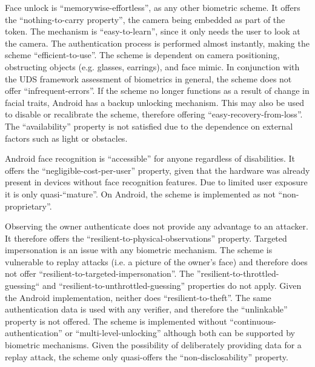 Face unlock is ``memorywise-effortless'', as any other biometric scheme. It offers the ``nothing-to-carry property'', the camera being embedded as part of the token. The mechanism is ``easy-to-learn'', since it only needs the user to look at the camera. The authentication process is performed almost instantly, making the scheme ``efficient-to-use''. The scheme is dependent on camera positioning, obstructing objects (e.g. glasses, earrings), and face mimic. In conjunction with the UDS framework assessment of biometrics in general, the scheme does not offer ``infrequent-errors''. If the scheme no longer functions as a result of change in facial traits, Android has a backup unlocking mechanism. This may also be used to disable or recalibrate the scheme, therefore offering ``easy-recovery-from-loss''. The ``availability'' property is not satisfied due to the dependence on external factors such as light or obstacles.
	
Android face recognition is ``accessible'' for anyone regardless of disabilities. It offers the ``negligible-cost-per-user'' property, given that the hardware was already present in devices without face recognition features. Due to limited user exposure it is only quasi-``mature''. On Android, the scheme is implemented as not ``non-proprietary''.
	
Observing the owner authenticate does not provide any advantage to an attacker. It therefore offers the ``resilient-to-physical-observations'' property. Targeted impersonation is an issue with any biometric mechanism. The scheme is vulnerable to replay attacks (i.e. a picture of the owner's face) and therefore does not offer ``resilient-to-targeted-impersonation''. The ''resilient-to-throttled-guessing`` and ``resilient-to-unthrottled-guessing'' properties do not apply. Given the Android implementation, neither does ``resilient-to-theft''. The same authentication data is used with any verifier, and therefore the ``unlinkable'' property is not offered. The scheme is implemented without ``continuous-authentication'' or ``multi-level-unlocking'' although both can be supported by biometric mechanisms. Given the possibility of deliberately providing data for a replay attack, the scheme only quasi-offers the ``non-disclosability'' property.

%
%